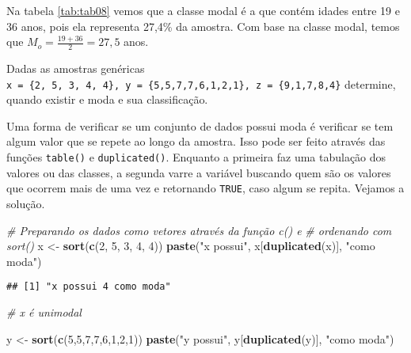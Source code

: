 \documentclass[11pt,]{style/krantz}
\makeatletter
\newenvironment{Shaded}{\begin{snugshade}}{\end{snugshade}}
\newcommand{\CommentTok}[1]{\textcolor[rgb]{0.56,0.35,0.01}{\textit{#1}}}
\newcommand{\DecValTok}[1]{\textcolor[rgb]{0.00,0.00,0.81}{#1}}
\newcommand{\KeywordTok}[1]{\textcolor[rgb]{0.13,0.29,0.53}{\textbf{#1}}}
\newcommand{\NormalTok}[1]{#1}
\newcommand{\StringTok}[1]{\textcolor[rgb]{0.31,0.60,0.02}{#1}}
\newenvironment{kframe}{%
\medskip{}
\setlength{\fboxsep}{.8em}
 \def\at@end@of@kframe{}%
 \ifinner\ifhmode%
  \def\at@end@of@kframe{\end{minipage}}%
  \begin{minipage}{\columnwidth}%
 \fi\fi%
 \def\FrameCommand##1{\hskip\@totalleftmargin \hskip-\fboxsep
 \colorbox{shadecolor}{##1}\hskip-\fboxsep
     \hskip-\linewidth \hskip-\@totalleftmargin \hskip\columnwidth}%
 \MakeFramed {\advance\hsize-\width
   \@totalleftmargin\z@ \linewidth\hsize
   \@setminipage}}%
 {\par\unskip\endMakeFramed%
 \at@end@of@kframe}
\renewenvironment{Shaded}{\begin{kframe}}{\end{kframe}}
\theoremstyle{definition}
\theoremstyle{definition}
\theoremstyle{definition}
\theoremstyle{remark}
\let\BeginKnitrBlock\begin \let\EndKnitrBlock\end
\makeatother
\begin{document}
Na tabela \ref{tab:tab08} vemos que a classe modal é a que contém idades entre 19 e 36 anos, pois ela representa 27,4\% da amostra. Com base na classe modal, temos que \(M_o = \frac{19+36}{2} = 27,5\) anos.

\BeginKnitrBlock{example}
\protect\hypertarget{exm:unnamed-chunk-56}{}{\label{exm:unnamed-chunk-56} }Dadas as amostras genéricas \texttt{x\ =\ \{2,\ 5,\ 3,\ 4,\ 4\},\ y\ =\ \{5,5,7,7,6,1,2,1\},\ z\ =\ \{9,1,7,8,4\}} determine, quando existir e moda e sua classificação.
\EndKnitrBlock{example}

\BeginKnitrBlock{solution}
\iffalse{} {Solução. } \fi{}Uma forma de verificar se um conjunto de dados possui moda é verificar se tem algum valor que se repete ao longo da amostra. Isso pode ser feito através das funções \texttt{table()} e \texttt{duplicated()}. Enquanto a primeira faz uma tabulação dos valores ou das classes, a segunda varre a variável buscando quem são os valores que ocorrem mais de uma vez e retornando \texttt{TRUE}, caso algum se repita. Vejamos a solução.
\EndKnitrBlock{solution}

\begin{Shaded}
\begin{Highlighting}[]
\CommentTok{# Preparando os dados como vetores através da função c() e }
\CommentTok{# ordenando com sort()}
\NormalTok{x <-}\StringTok{ }\KeywordTok{sort}\NormalTok{(}\KeywordTok{c}\NormalTok{(}\DecValTok{2}\NormalTok{, }\DecValTok{5}\NormalTok{, }\DecValTok{3}\NormalTok{, }\DecValTok{4}\NormalTok{, }\DecValTok{4}\NormalTok{))}
\KeywordTok{paste}\NormalTok{(}\StringTok{"x possui"}\NormalTok{, x[}\KeywordTok{duplicated}\NormalTok{(x)], }\StringTok{"como moda"}\NormalTok{)}
\end{Highlighting}
\end{Shaded}

\begin{verbatim}
## [1] "x possui 4 como moda"
\end{verbatim}

\begin{Shaded}
\begin{Highlighting}[]
\CommentTok{# x é unimodal}

\NormalTok{y <-}\StringTok{ }\KeywordTok{sort}\NormalTok{(}\KeywordTok{c}\NormalTok{(}\DecValTok{5}\NormalTok{,}\DecValTok{5}\NormalTok{,}\DecValTok{7}\NormalTok{,}\DecValTok{7}\NormalTok{,}\DecValTok{6}\NormalTok{,}\DecValTok{1}\NormalTok{,}\DecValTok{2}\NormalTok{,}\DecValTok{1}\NormalTok{))}
\KeywordTok{paste}\NormalTok{(}\StringTok{"y possui"}\NormalTok{, y[}\KeywordTok{duplicated}\NormalTok{(y)], }\StringTok{"como moda"}\NormalTok{)}
\end{Highlighting}
\end{Shaded}
\end{document}
